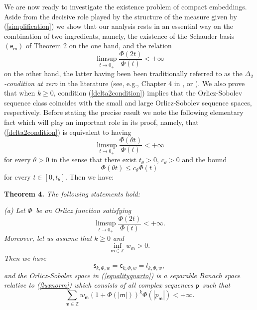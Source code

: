 \documentclass{article}
\begin{document}
We are now ready to investigate the existence problem of compact embeddings.
Aside from the decisive role played by the structure of the measure given by
(\ref{simplification}) we show that our analysis rests in an essential way
on the combination of two ingredients, namely, the existence of the Schauder
basis $\left( \mathsf{e}_{\mathsf{m}}\right) $ of Theorem 2 on the one hand,
and the relation%
\begin{equation}
\limsup_{t\rightarrow 0_{+}}\frac{\Phi \left( 2t\right) }{\Phi \left(
t\right) }<+\infty  \label{delta2condition}
\end{equation}%
on the other hand, the latter having been been traditionally referred to as
the $\Delta _{2}$\textit{-condition at zero }in the literature (see, e.g.,
Chapter 4 in \cite{lindenstrausstra}, or \cite{raoren2}). We also prove that
when $k\geq 0$, condition (\ref{delta2condition}) implies that the
Orlicz-Sobolev sequence class coincides with the small and large
Orlicz-Sobolev sequence spaces, respectively. Before stating the precise
result we note the following elementary fact which will play an important
role in its proof, namely, that (\ref{delta2condition}) is equivalent to
having%
\begin{equation*}
\limsup_{t\rightarrow 0_{+}}\frac{\Phi \left( \theta t\right) }{\Phi \left(
t\right) }<+\infty
\end{equation*}%
for every $\theta >0$ in the sense that there exist $t_{\theta }>0$, $%
c_{\theta }>0$ and the bound%
\begin{equation}
\Phi \left( \theta t\right) \leq c_{\theta }\Phi \left( t\right)
\label{bound}
\end{equation}%
for every $t\in \left[ 0,t_{\theta }\right] $. Then we have:

\bigskip

\textbf{Theorem 4. }\textit{The following statements hold:}

\textit{(a) Let }$\Phi $\textit{\ be an Orlicz function satisfying}%
\begin{equation*}
\limsup_{t\rightarrow 0_{+}}\frac{\Phi \left( 2t\right) }{\Phi \left(
t\right) }<+\infty .
\end{equation*}%
\textit{Moreover, let us assume that }$k\geq 0$ \textit{and}%
\begin{equation}
\inf_{\mathsf{m\in }\mathbb{Z}}w_{\mathsf{m}}>0.  \label{infimumter}
\end{equation}%
\textit{Then we have}%
\begin{equation}
\mathsf{s}_{k,\Phi ,w}=\mathsf{c}_{k,\Phi ,w}=l_{k,\Phi ,w},
\label{equalityquarto}
\end{equation}%
\textit{and the Orlicz-Sobolev space in (\ref{equalityquarto}) is a
separable Banach space relative to (\ref{luxnorm}) which consists of all
complex sequences }$\mathsf{p}$\ \textit{such that}%
\begin{equation*}
\sum_{\mathsf{m}\in \mathbb{Z}}w_{\mathsf{m}}\left( 1+\Phi \left( \left\vert 
\mathsf{m}\right\vert \right) \right) ^{k}\Phi \left( \left\vert p_{\mathsf{m%
}}\right\vert \right) <+\infty .
\end{equation*}
\end{document}
